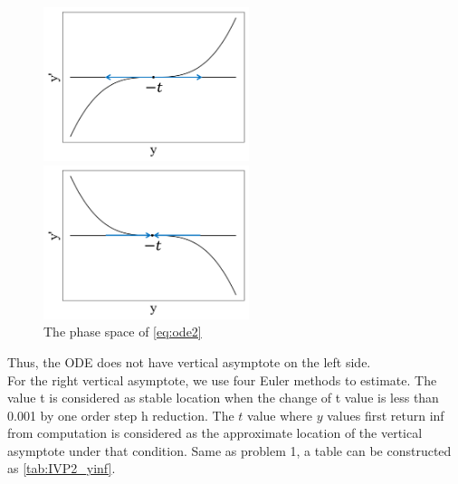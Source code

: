 \documentclass[a4paper]{article}
\begin{document}
	\begin{figure}[H]
		\subfigure 
		{
			\begin{minipage}{9cm}
				\centering      
				\includegraphics[width=6cm]{img/ivp2_phase_graph_1.png}
			\end{minipage}
		}
		\subfigure 
		{
			\begin{minipage}{7cm}
				\centering      
				\includegraphics[width=6cm]{img/ivp2_phase_graph_2.png}
			\end{minipage}
		}
		\caption{\label{fig:ivp2_phase} The phase space of \autoref{eq:ode2}} 
	\end{figure}
	
	Thus, the ODE does not have vertical asymptote on the left side. \\
	
	For the right vertical asymptote, we use four Euler methods to estimate. The value t is considered as stable location when the change of t value is less than 0.001 by one order step h reduction. The $t$ value where $y$ values first return inf from computation is considered as the approximate location of the vertical asymptote under that condition. Same as problem 1, a table can be constructed as \autoref{tab:IVP2_yinf}.
	
\end{document}
